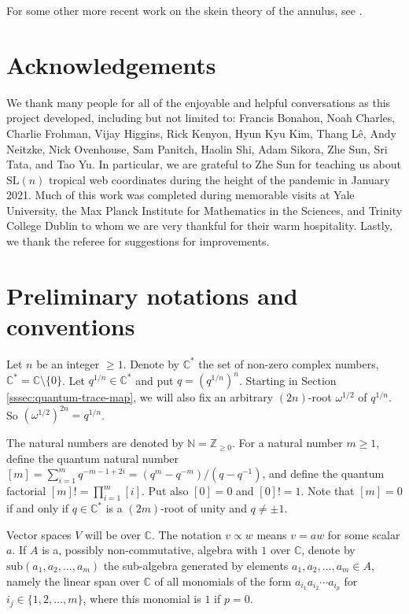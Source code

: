 \documentclass[12pt,
	]{amsart}
\theoremstyle{definition}
\newcommand{\mrm}[1]{\mathrm{#1}}
\newcommand{\mbb}[1]{\mathbb{#1}}
\newcommand{\lp}{\left(}\newcommand{\rp}{\right)}
\newcommand{\sub}[1]{\mrm{sub}\lp#1\rp}
\newcommand{\inv}[1]{#1^{-1}}
\newcommand{\Z}{\mbb{Z}}
\newcommand{\nnegZ}{\mbb{N}}
\newcommand{\C}{\mbb{C}}
\newcommand{\sC}{\C^\ast}
\newcommand{\nsl}{\mrm{SL}(n)}
\newcommand{\qroot}{q^{1/n}}
\newcommand{\wroot}{\omega}
\begin{document}
For some other more recent work on the skein theory of the annulus, see \cite{beaumontgould2023powersumelementsg2, bonahon2023centralelementsmathrmsldskeinalgebra, douglasMR4688540, queffelecMR4715537}.  

\section*{Acknowledgements}

We thank many people for all of the enjoyable and helpful conversations as this project developed, including but not limited to: Francis Bonahon, Noah Charles, Charlie Frohman, Vijay Higgins, Rick Kenyon, Hyun Kyu Kim, Thang L\^{e}, Andy Neitzke, Nick Ovenhouse, Sam Panitch, Haolin Shi, Adam Sikora, Zhe Sun, Sri Tata, and Tao Yu.  In particular, we are grateful to Zhe Sun for teaching us about $\nsl$ tropical web coordinates during the height of the pandemic in January 2021.  Much of this work was completed during memorable visits at Yale University, the Max Planck Institute for Mathematics in the Sciences, and Trinity College Dublin to whom we are very thankful for their warm hospitality.  Lastly, we thank the referee for suggestions for improvements.

\section*{Preliminary notations and conventions}

Let $n$ be an integer $\geq1$.  Denote by $\sC$ the set of non-zero complex numbers, $\sC=\C\setminus\{0\}$.  Let $\qroot\in\sC$ and put $q=(\qroot)^n$.  Starting in Section \ref{sssec:quantum-trace-map}, we will also fix an arbitrary $(2n)$-root $\wroot^{1/2}$ of $\qroot$.  So $(\wroot^{1/2})^{2n}=\qroot$.  

The natural numbers are denoted by $\nnegZ=\Z_{\geq0}$. For a natural number $m \geq 1$, define the quantum natural number $[m]=\sum_{i=1}^m q^{-m-1+2i}=(q^m-q^{-m})/(q-\inv{q})$, and define the quantum factorial $[m]!=\prod_{i=1}^m [i]$.  Put also $[0]=0$ and $[0]!=1$.  Note that $[m]=0$ if and only if $q\in\sC$ is a $(2m)$-root of unity and $q\neq\pm 1$.  

Vector spaces $V$ will be over $\C$.  The notation $v\propto w$ means $v=a w$ for some scalar $a$.    If $A$ is a, possibly non-commutative, algebra with $1$ over $\C$, denote by $\sub{a_1,a_2,\dots,a_m}$ the sub-algebra generated by elements $a_1,a_2,\dots,a_m\in A$, namely the linear span over $\C$ of all monomials of the form $a_{i_1}a_{i_2}\cdots a_{i_p}$ for $i_j\in\{1,2,\dots,m\}$, where this monomial is $1$ if $p=0$.  
\end{document}

